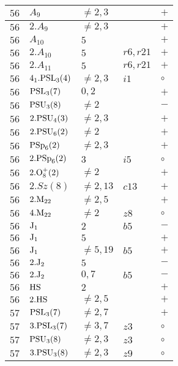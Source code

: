 \documentclass[a4paper, 11pt]{article}
\begin{document}
\begin{longtable}{lllll}
		$56$ & $A_{9}$ & $\neq 2,3$ &  & $+$ \\ \hline
		$56$ & $2.A_{9}$ & $\neq 2,3$ &  & $+$ \\ \hline
		$56$ & $A_{10}$ & $5$ &  & $+$ \\ \hline
		$56$ & $2.A_{10}$ & $5$ & $r6, r21$ & $+$ \\ \hline
		$56$ & $2.A_{11}$ & $5$ & $r6, r21$ & $+$ \\ \hline
		$56$ & $4_1.{\rm PSL}_{3}(4)$ & $\neq 2,3$ & $i1$ & $\circ$ \\ \hline
		$56$ & ${\rm PSL}_{3}(7)$ & $0,2$ &  & $+$ \\ \hline
		$56$ & ${\rm PSU}_{3}(8)$ & $\neq 2$ &  & $-$ \\ \hline
		$56$ & $2.{\rm PSU}_{4}(3)$ & $\neq 2,3$ &  & $+$ \\ \hline
		$56$ & $2.{\rm PSU}_{6}(2)$ & $\neq 2$ &  & $+$ \\ \hline
		$56$ & ${\rm PSp}_{6}(2)$ & $\neq 2,3$ &  & $+$ \\ \hline
		$56$ & $2.{\rm PSp}_{6}(2)$ & $3$ & $i5$ & $\circ$ \\ \hline
		$56$ & $2.{\rm O}_{8}^+(2)$ & $\neq 2$ &  & $+$ \\ \hline
		$56$ & $2.Sz(8)$ & $\neq 2,13$ & $c13$ & $+$ \\ \hline
		$56$ & $2.{\rm M}_{22}$ & $\neq 2,5$ &  & $+$ \\ \hline
		$56$ & $4.{\rm M}_{22}$ & $\neq 2$ & $z8$ & $\circ$ \\ \hline
		$56$ & ${\rm J}_1$ & $2$ & $b5$ & $-$ \\ \hline
		$56$ & ${\rm J}_1$ & $5$ &  & $+$ \\ \hline
		$56$ & ${\rm J}_1$ & $\neq 5,19$ & $b5$ & $+$ \\ \hline
		$56$ & $2.{\rm J}_2$ & $5$ &  & $-$ \\ \hline
		$56$ & $2.{\rm J}_2$ & $0,7$ & $b5$ & $-$ \\ \hline
		$56$ & ${\rm HS}$ & $2$ &  & $+$ \\ \hline
		$56$ & $2.{\rm HS}$ & $\neq 2,5$ &  & $+$ \\ \hline
		$57$ & ${\rm PSL}_{3}(7)$ & $\neq 2,7$ &  & $+$ \\ \hline
		$57$ & $3.{\rm PSL}_{3}(7)$ & $\neq 3, 7$ & $z3$ & $\circ$ \\ \hline
		$57$ & ${\rm PSU}_{3}(8)$ & $\neq 2,3$ & $z3$ & $\circ$ \\ \hline
		$57$ & $3.{\rm PSU}_{3}(8)$ & $\neq 2,3$ & $z9$ & $\circ$ \\ \hline

\end{longtable}
\end{document}
